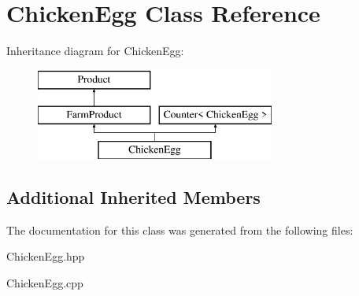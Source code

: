 \hypertarget{class_chicken_egg}{}\section{Chicken\+Egg Class Reference}
\label{class_chicken_egg}
Inheritance diagram for Chicken\+Egg\+:\begin{figure}[H]
\begin{center}
\leavevmode
\includegraphics[height=3.000000cm]{class_chicken_egg}
\end{center}
\end{figure}
\subsection*{Additional Inherited Members}


The documentation for this class was generated from the following files\+:\begin{DoxyCompactItemize}
\item 
Chicken\+Egg.\+hpp\item 
Chicken\+Egg.\+cpp\end{DoxyCompactItemize}
